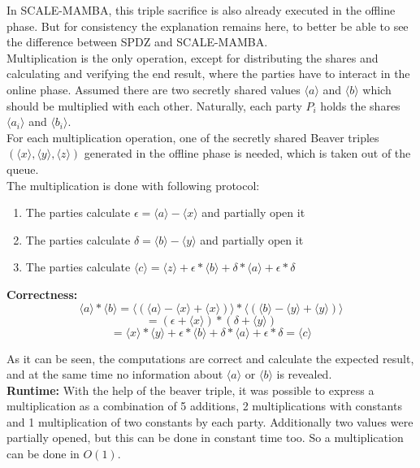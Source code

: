 \documentclass[english,runningheads,a4paper]{llncs}[2018/03/10]
\begin{document}
In SCALE-MAMBA, this triple sacrifice is also already executed in the offline phase. But for consistency the explanation remains here, to better be able to see the difference between SPDZ and SCALE-MAMBA.\\


Multiplication is the only operation, except for distributing the shares and calculating and verifying the end result, where the parties have to interact in the online phase.
Assumed there are two secretly shared values \( \langle a \rangle\) and \( \langle b \rangle\) which should be multiplied with each other. Naturally, each party $P_i$ holds the shares \(\langle a_i\rangle \) and \(\langle b_i\rangle \).\\
For each multiplication operation, one of the secretly shared Beaver triples \( (\langle x \rangle ,\langle y\rangle , \langle z\rangle )\) generated in the offline phase is needed, which is taken out of the queue.\\ The multiplication is done with following protocol:
\begin{enumerate}
\item The parties calculate \( \epsilon = \langle a \rangle - \langle x \rangle \) and partially open it
\item The parties calculate \( \delta = \langle b \rangle - \langle y \rangle \) and partially open it
\item The parties calculate \( \langle c \rangle = \langle z \rangle + \epsilon * \langle b \rangle + \delta * \langle a \rangle + \epsilon * \delta \) 
\end{enumerate}
\textbf{Correctness:} 
$$  \langle a \rangle * \langle b \rangle = \langle ( \langle a \rangle- \langle x \rangle+ \langle x \rangle) \rangle * \langle ( \langle b \rangle- \langle y \rangle+ \langle y \rangle) \rangle$$
$$ = ( \epsilon  +\langle  x \rangle ) * ( \delta  + \langle y \rangle )$$
$$ = \langle x \rangle * \langle y \rangle + \epsilon * \langle b \rangle + \delta * \langle a \rangle + \epsilon * \delta =  \langle c \rangle $$

As it can be seen, the computations are correct and calculate the expected result, and at the same time no information about \(\langle a \rangle \) or \(\langle b \rangle \) is revealed.\\

\textbf{Runtime:} With the help of the beaver triple, it was possible to express a multiplication as a combination of 5 additions, 2 multiplications with constants and 1 multiplication of two constants by each party. Additionally two values were partially opened, but this can be done in constant time too. So a multiplication can be done in \(O(1)\).\\
\end{document}
